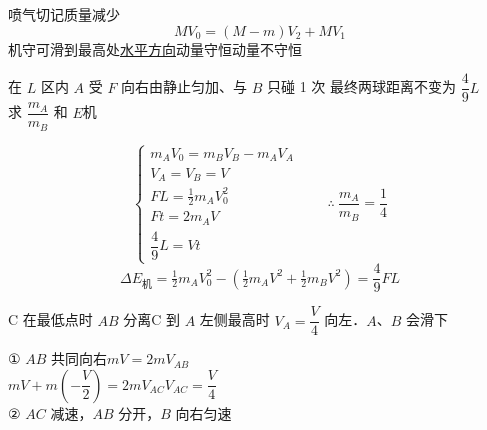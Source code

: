 喷气切记质量减少
\[
MV_0=(M-m)V_2+MV_1
\]
机守可滑到最高处\quad \underline{水平方向}动量守恒\quad 动量不守恒
\begin{problem}
在 $L$ 区内 $A$ 受 $F$ 向右由静止匀加、与 $B$ 只碰 1 次 最终两球距离不变为 $\dfrac49L$\\
求 $\dfrac{m_A}{m_B}$ 和 $E$机
\begin{solution}
\[
\begin{cases}
m_AV_0=m_BV_B-m_AV_A\\
V_A=V_B=V\\
FL=\tfrac12 m_AV_0^2\\
Ft=2m_AV\\
\dfrac49L=Vt
\end{cases}
\qquad\therefore\ \dfrac{m_A}{m_B}=\dfrac14
\]
\[
\Delta E_{\text{机}}=\tfrac12 m_AV_0^2-\left(\tfrac12 m_AV^2+\tfrac12 m_BV^2\right)=\dfrac49FL
\]
\end{solution}
\end{problem}
\begin{problem}
C 在最低点时 $AB$ 分离\quad C 到 $A$ 左侧最高时 $V_A=\dfrac V4$ 向左．$A$、$B$ 会滑下
\begin{solution}
① $AB$ 共同向右\quad $mV=2mV_{AB}$\\
$mV+m\left(-\dfrac V2\right)=2mV_{AC}$\qquad $V_{AC}=\dfrac V4$\\
② $AC$ 减速，$AB$ 分开，$B$ 向右匀速
\end{solution}
\end{problem}
